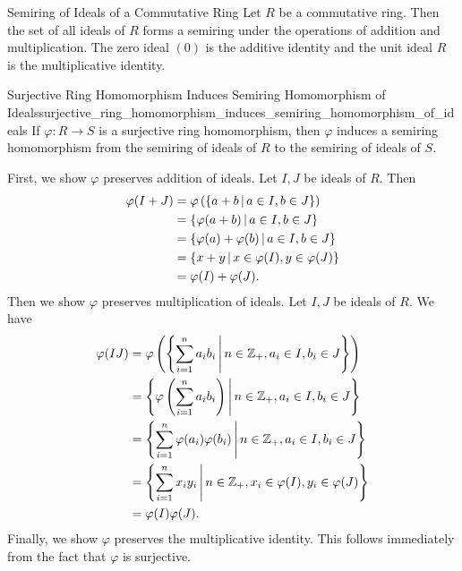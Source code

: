 \begin{definition}{Semiring of Ideals of a Commutative Ring}{}
    Let $R$ be a commutative ring. Then the set of all ideals of $R$ forms a semiring under the operations of addition and multiplication. The zero ideal $(0)$ is the additive identity and the unit ideal $R$ is the multiplicative identity. 
\end{definition}

\begin{proposition}{Surjective Ring Homomorphism Induces Semiring Homomorphism of Ideals}{surjective_ring_homomorphism_induces_semiring_homomorphism_of_ideals}
    If $\varphi:R\to S$ is a surjective ring homomorphism, then $\varphi$ induces a semiring homomorphism from the semiring of ideals of $R$ to the semiring of ideals of $S$.
\end{proposition}
\begin{prf}
    First, we show $\varphi$ preserves addition of ideals. Let $I,J$ be ideals of $R$. Then
    \begin{align*}
        \varphi(I+J)&=\varphi\left(\left\{a+b\,\middle\vert\, a\in I,b\in J\right\}\right)\\
        &=\left\{\varphi(a+b)\,\middle\vert\, a\in I,b\in J\right\}\\
        &=\left\{\varphi(a)+\varphi(b)\,\middle\vert\, a\in I,b\in J\right\}\\
        &=\left\{x+y\,\middle\vert\, x\in \varphi(I),y\in \varphi(J)\right\}\\
        &=\varphi(I)+\varphi(J).
    \end{align*}
    Then we show $\varphi$ preserves multiplication of ideals. Let $I,J$ be ideals of $R$. We have
    \begin{align*}
        \varphi(IJ)&=\varphi\left(\left\{\sum_{i=1}^n a_ib_i\,\middle\vert\, n\in\mathbb{Z}_{+},a_i\in I,b_i\in J\right\}\right)\\
        &=\left\{\varphi\left(\sum_{i=1}^n a_ib_i\right)\,\middle\vert\, n\in\mathbb{Z}_{+},a_i\in I,b_i\in J\right\}\\
        &=\left\{\sum_{i=1}^n \varphi(a_i)\varphi(b_i)\,\middle\vert\, n\in\mathbb{Z}_{+},a_i\in I,b_i\in J\right\}\\
        &=\left\{\sum_{i=1}^n x_iy_i\,\middle\vert\, n\in\mathbb{Z}_{+}, x_i\in \varphi(I),y_i\in \varphi(J)\right\}\\
        &=\varphi(I)\varphi(J).
    \end{align*}
    Finally, we show $\varphi$ preserves the multiplicative identity. This follows immediately from the fact that $\varphi$ is surjective.
\end{prf}

